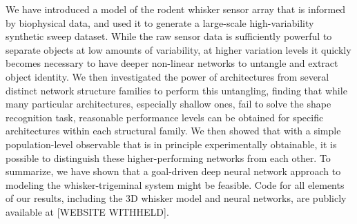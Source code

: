 We have introduced a model of the rodent whisker sensor array that is informed by biophysical data, and used it to generate a large-scale high-variability synthetic sweep dataset. 
While the raw sensor data is sufficiently powerful to separate objects at low amounts of variability, at higher variation levels it quickly becomes necessary to have deeper non-linear networks to untangle and extract object identity. 
We then investigated the power of architectures from several distinct network structure families to perform this untangling, finding that while many particular architectures, especially shallow ones, fail to solve the shape recognition task, reasonable performance levels can be obtained for specific architectures within each structural family.
We then showed that with a simple population-level observable that is in principle experimentally obtainable, it is possible to distinguish these higher-performing networks from each other. 
To summarize, we have shown that a goal-driven deep neural network approach to modeling the whisker-trigeminal system might be feasible. 
Code for all elements of our results, including the 3D whisker model and neural networks, are publicly available at [WEBSITE WITHHELD].


